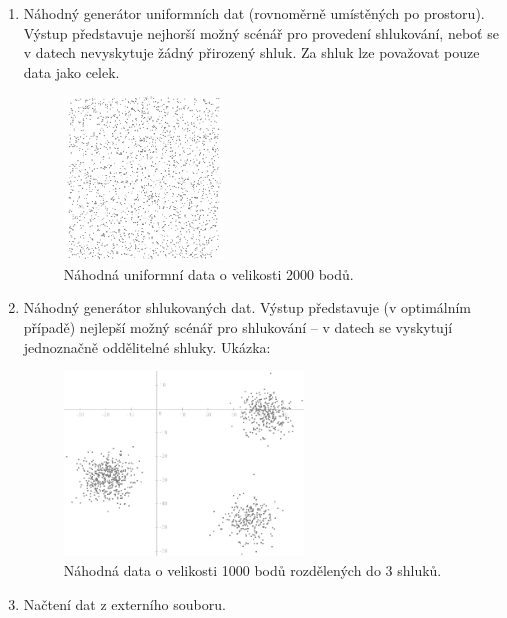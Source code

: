 \documentclass[pdftex,a4paper]{article}
\begin{document}
\begin{enumerate}
	
	\item Náhodný generátor uniformních dat (rovnoměrně umístěných po prostoru). Výstup představuje nejhorší možný scénář pro provedení shlukování, neboť se v datech nevyskytuje žádný přirozený shluk. Za shluk lze považovat pouze data jako celek.
	
	\begin{figure}[h]
		\centering
		\includegraphics[width=0.4\textwidth]{res/datauniform.png}
		\caption{Náhodná uniformní data o velikosti 2000 bodů.}
	\end{figure}

	\newpage

	\item Náhodný generátor shlukovaných dat. Výstup představuje (v optimálním případě) nejlepší možný scénář pro shlukování -- v datech se vyskytují jednoznačně oddělitelné shluky. Ukázka:
	\begin{figure}[h]
		\centering
		\includegraphics[width=0.6\textwidth]{res/dataclustered.png}
		\caption{Náhodná data o velikosti 1000 bodů rozdělených do 3 shluků.}
	\end{figure}

	\item Načtení dat z externího souboru.
\end{enumerate}
\end{document}
